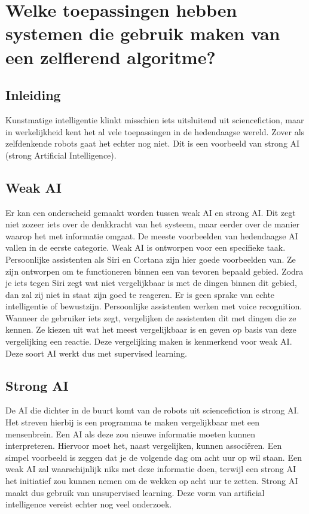 \section{Welke toepassingen hebben systemen die gebruik maken van een zelflerend algoritme?}

\subsection{Inleiding}
Kunstmatige intelligentie klinkt misschien iets uitsluitend uit sciencefiction, maar in werkelijkheid kent het al vele toepassingen in de hedendaagse wereld. Zover als zelfdenkende robots gaat het echter nog niet. Dit is een voorbeeld van strong AI (strong Artificial Intelligence).

\subsection{Weak AI}
Er kan een onderscheid gemaakt worden tussen weak AI en strong AI. Dit zegt niet zozeer iets over de denkkracht van het systeem, maar eerder over de manier waarop het met informatie omgaat.
De meeste voorbeelden van hedendaagse AI vallen in de eerste categorie. Weak AI is ontworpen voor een specifieke taak. Persoonlijke assistenten als Siri en Cortana zijn hier goede voorbeelden van. Ze zijn ontworpen om te functioneren binnen een van tevoren bepaald gebied. Zodra je iets tegen Siri zegt wat niet vergelijkbaar is met de dingen binnen dit gebied, dan zal zij niet in staat zijn goed te reageren. Er is geen sprake van echte intelligentie of bewustzijn.
Persoonlijke assistenten werken met voice recognition. Wanneer de gebruiker iets zegt, vergelijken de assistenten dit met dingen die ze kennen. Ze kiezen uit wat het meest vergelijkbaar is en geven op basis van deze vergelijking een reactie. Deze vergelijking maken is kenmerkend voor weak AI. Deze soort AI werkt dus met supervised learning.

\subsection{Strong AI}
De AI die dichter in de buurt komt van de robots uit sciencefiction is strong AI. Het streven hierbij is een programma te maken vergelijkbaar met een mensenbrein. \cite{Searle} Een AI als deze zou nieuwe informatie moeten kunnen interpreteren. Hiervoor moet het, naast vergelijken, kunnen associëren. Een simpel voorbeeld is zeggen dat je de volgende dag om acht uur op wil staan. Een weak AI zal waarschijnlijk niks met deze informatie doen, terwijl een strong AI het initiatief zou kunnen nemen om de wekken op acht uur te zetten. Strong AI maakt dus gebruik van unsupervised learning.
Deze vorm van artificial intelligence vereist echter nog veel onderzoek.

